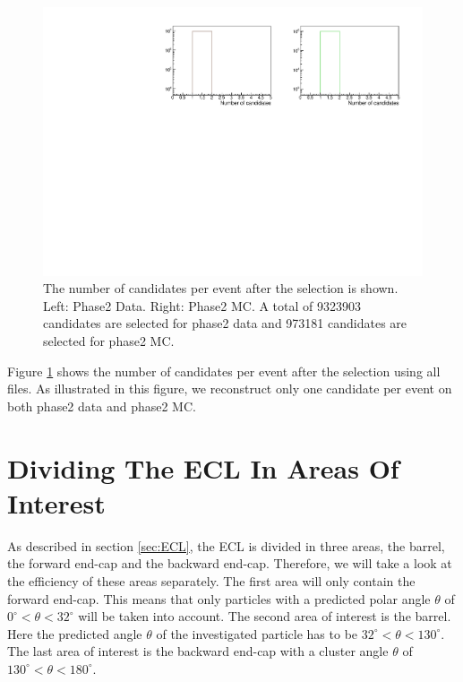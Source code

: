 \documentclass[a4paper,11pt,twosided,final,german,openbib,pdftex,listof=totoc,bibliography=totoc]{scrbook}
\begin{document}
\begin{figure}[h!]
	\includegraphics[width=\textwidth]{Plots/master/CCand.pdf}
	\caption[Total Number Of Events After The Selection]{The number of candidates per event after the selection is shown. Left: Phase2 Data. Right: Phase2 MC. A total of 9323903 candidates are selected for phase2 data and 973181 candidates are selected for phase2 MC.}
	\label{fig:nCandAS}
\end{figure}


Figure \ref{fig:nCandAS} shows the number of candidates per event after the selection using all files. As illustrated in this figure, we reconstruct only one candidate per event on both phase2 data and phase2 MC.


\section{Dividing The ECL In Areas Of Interest}
\label{sec:DivECL}

As described in section \ref{sec:ECL}, the ECL is divided in three areas, the barrel, the forward end-cap and the backward end-cap. Therefore, we will take a look at the efficiency of these areas separately. The first area will only contain the forward end-cap. This means that only particles with a predicted polar angle $\theta$ of $0^\circ <\theta<32^\circ$ will be taken into account. The second area of interest is the barrel. Here the predicted angle $\theta$ of the investigated particle has to be $32^\circ < \theta < 130^\circ$. The last area of interest is the backward end-cap with a cluster angle $\theta$ of $130^\circ <\theta < 180^\circ$.  
\end{document}
